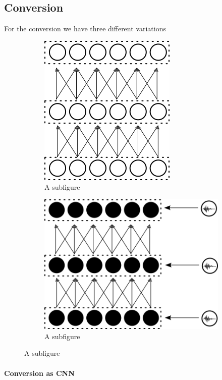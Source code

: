 \subsection{Conversion}

For the conversion we have three different variations

\begin{figure}
	\centering
	\begin{subfigure}[t]{.5\textwidth}
  		\centering
  		\includegraphics[width=.6\linewidth]{imgs/convert_cnn.png}
  		\caption{A subfigure}
  		\label{fig:sub1}
	\end{subfigure}%
	\begin{subfigure}[t]{.5\textwidth}
  		\centering
  		\includegraphics[width=.8\linewidth]{imgs/convert_dbn.png}
  		\caption{A subfigure}
  		\label{fig:sub2}
	\end{subfigure}
\end{figure}


\paragraph{Conversion as CNN} 

